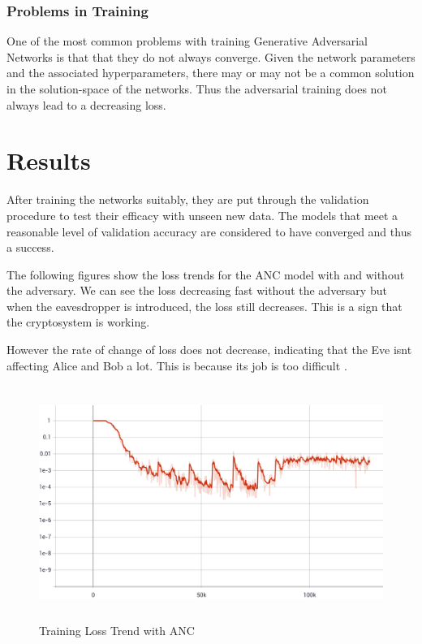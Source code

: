 \documentclass[a4paper]{article}
\begin{document}
      \subsubsection{Problems in Training}
      One of the most common problems with training Generative Adversarial Networks is that that
      they do not always converge. Given the network parameters and the associated hyperparameters,
      there may or may not be a common solution in the solution-space of the networks.
      Thus the adversarial training does not always lead to a decreasing loss.
  
  \newpage
  \section{Results}
  After training the networks suitably, they are put through the validation procedure to test their
  efficacy with unseen new data. The models that meet a reasonable level of validation accuracy are
  considered to have converged and thus a success.

  The following figures show the loss trends for the ANC model with and without the adversary.
  We can see the loss decreasing fast without the adversary but when the eavesdropper is introduced,
  the loss still decreases. This is a sign that the cryptosystem is working.

  However the rate of change of loss does not decrease, indicating that the Eve isnt affecting 
  Alice and Bob a lot. This is because its job is too difficult \cite{perfanc}.

  \begin{figure}[H]
    \centering
    \includegraphics[height=3in]{../../models/anc/graphs/Loss_Training.png}
    \caption{Training Loss Trend with ANC}
    \label{fig:trn_crnet}
  \end{figure}
\end{document}
